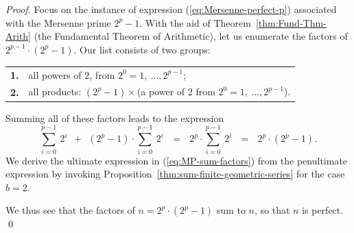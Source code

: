 \begin{proof}
Focus on the instance of expression (\ref{eq:Mersenne-perfect-p})
associated with the Mersenne prime $2^p-1$.  With the aid of
Theorem~\ref{thm:Fund-Thm-Arith} (the Fundamental Theorem of
Arithmetic), let us enumerate the factors of $2^{p-1} \cdot (2^p-1)$.
Our list consists of two groups:

\begin{tabular}{cl}
{\bf 1.} &
all powers of $2$, from $2^0 =1, \ \ldots, 2^{p-1}$; \\
{\bf 2.} &
all products: $(2^p-1) \times$(a power of $2$ from $2^0 =1, \ \ldots,
2^{p-1}$).
\end{tabular}

\noindent
Summing all of these factors leads to the expression
\begin{equation}
\label{eq:MP-sum-factors}
\sum_{i=0}^{p-1} \ 2^i \ \ + \ \ (2^p-1) \cdot \sum_{i=0}^{p-1} \ 2^i
 \ \ \ = \ \ \  2^p \cdot \sum_{i=0}^{p-1} \ 2^i
 \ \ \ = \ \ \ 2^p \cdot (2^p -1).
\end{equation}
We derive the ultimate expression in (\ref{eq:MP-sum-factors}) from
the penultimate expression by invoking
Proposition~\ref{thm:sum-finite-geometric-series} for the case $b=2$.

We thus see that the factors of $n = 2^p \cdot (2^p -1)$ sum to $n$,
so that $n$ is perfect.
\qed
\end{proof}



%







